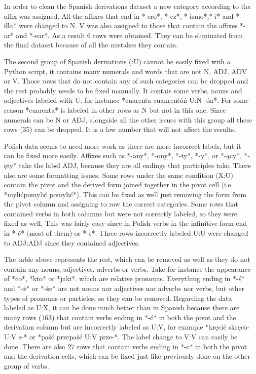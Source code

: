 \documentclass[12pt]{article}
\begin{document}
In order to clean the Spanish derivations dataset a new category according to the affix was assigned. All the affixes that end in *-ero*, *-ez*, *-ismo*,*-í* and *-illa* were changed to N. V was also assigned to those that contain the affixes *-ar* and *-ear*. As a result 6 rows were obtained. They can be eliminated from the final dataset because of all the mistakes they contain.

The second group of Spanish derivations (:U) cannot be easily fixed with a Python script, it contains many numerals and words that are not N, ADJ, ADV or V. Those rows that do not contain any of such categories can be dropped and the rest probably needs to be fixed manually. It contais some verbs, nouns and adjectives labeled with U, for instance *cuarenta cuanrentóń U:N -ón*. For some reason *cuarenta* is labeled in other rows as N but not in this one. Since numerals can be N or ADJ, alongside all the other issues with this group all these rows (35) can be dropped. It is a low number that will not affect the results.

Polish data seems to need more work as there are more incorrect labels, but it can be fixed more easily. Affixes such as *-any*, *-ony*, *-ty*, *-y*, or *-ący*, *-ęty* take the label ADJ, because they are all endings that participles take. There also are some formatting issues. Some rows under the same condition (X:U) contain the pivot and the derived form joined together in the pivot cell (i.e. *mylićpomylić	pomylić*). This can be fixed as well just removing the form from the pivot column and assigning to row the correct categories. Some rows that contained verbs in both columns but were not correctly labeled, so they were fixed as well. This was fairly easy since in Polish verbs in the infinitive form end in *-ć* (most of them) or *-c*. Three rows incorrectly labeled U:U were changed to ADJ:ADJ since they contained adjectives.

The table above represents the rest, which can be removed as well as they do not contain any nouns, adjectives, adverbs or verbs. Take for instance the appearance of *co*, *kto* or *jaki*. which are relative pronouns. Everything ending in *-ś* and *-ż* or *-że* are not nouns nor adjectives nor adverbs nor verbs, but other types of pronouns or particles, so they can be removed. Regarding the data labeled as U:X, it can be done much better than in Spanish because there are many rows (163) that contain verbs ending in *-ć* in both the pivot and the derivation column but are incorrectly labeled as U:V, for example *kręcić skręcic U:V s-* or *paść przepaść U:V prze-*. The label change to V:V can easily be done. There are also 27 rows that contain verbs ending in *-c* in both the pivot and the derivation cells, which can be fixed just like previously done on the other group of verbs.
\end{document}
